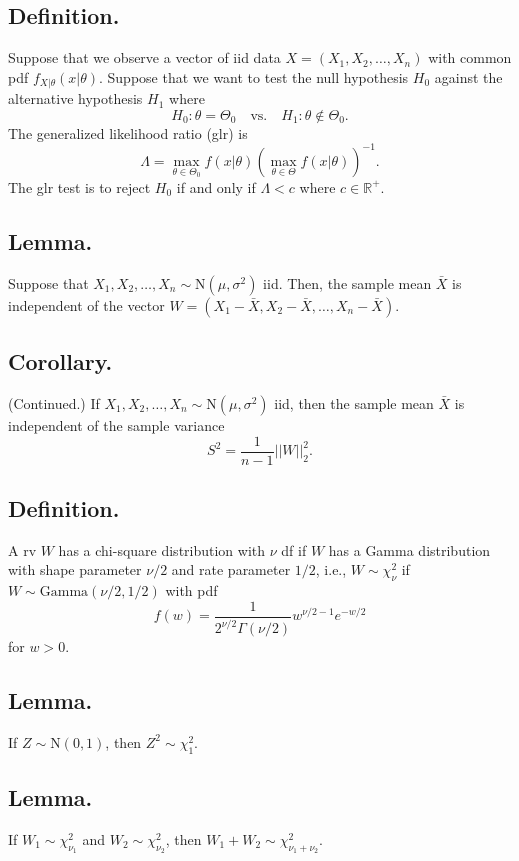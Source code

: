 \documentclass[titlepage]{article}
\begin{document}
\subsection{Definition.} Suppose that we observe a vector of iid data $X = (X_{1}, X_{2}, \ldots, X_{n})$ with common pdf $f_{X|\theta}(x|\theta)$. Suppose that we want to test the null hypothesis $H_{0}$ against the alternative hypothesis $H_{1}$ where 
$$H_{0}: \theta = \Theta_{0} \quad \text{vs.} \quad H_{1}: \theta \not\in \Theta_{0}.$$
The generalized likelihood ratio (glr) is 
$$\Lambda = \max_{\theta \in \Theta_{0}}f(x|\theta)(\max_{\theta \in \Theta}f(x|\theta))^{-1}.$$
The glr test is to reject $H_{0}$ if and only if $\Lambda < c$ where $c \in \mathbb{R}^{+}$.

\subsection{Lemma.} Suppose that $X_{1}, X_{2}, \ldots, X_{n} \sim \text{N}(\mu, \sigma^{2})$ iid. Then, the sample mean $\bar{X}$ is independent of the vector $W = (X_{1} - \bar{X}, X_{2} - \bar{X}, \ldots, X_{n} - \bar{X})$.

\subsection{Corollary.} (Continued.) If $X_{1}, X_{2}, \ldots, X_{n} \sim \text{N}(\mu, \sigma^{2})$ iid, then the sample mean $\bar{X}$ is independent of the sample variance 
$$S^{2} = \frac{1}{n-1}||W||_{2}^{2}.$$

\subsection{Definition.} A rv $W$ has a chi-square distribution with $\nu$ df if $W$ has a Gamma distribution with shape parameter $\nu/2$ and rate parameter $1/2$, i.e., $W \sim \chi_{\nu}^{2}$ if $W \sim \text{Gamma}(\nu/2, 1/2)$ with pdf 
$$f(w) = \frac{1}{2^{\nu/2}\Gamma(\nu/2)}w^{\nu/2-1}e^{-w/2}$$
for $w > 0$.

\subsection{Lemma.} If $Z \sim \text{N}(0, 1)$, then $Z^{2} \sim \chi_{1}^{2}$.

\subsection{Lemma.} If $W_{1} \sim \chi_{\nu_{1}}^{2}$ and $W_{2} \sim \chi_{\nu_{2}}^{2}$, then $W_{1} + W_{2} \sim \chi_{\nu_{1} + \nu_{2}}^{2}$.
\end{document}
